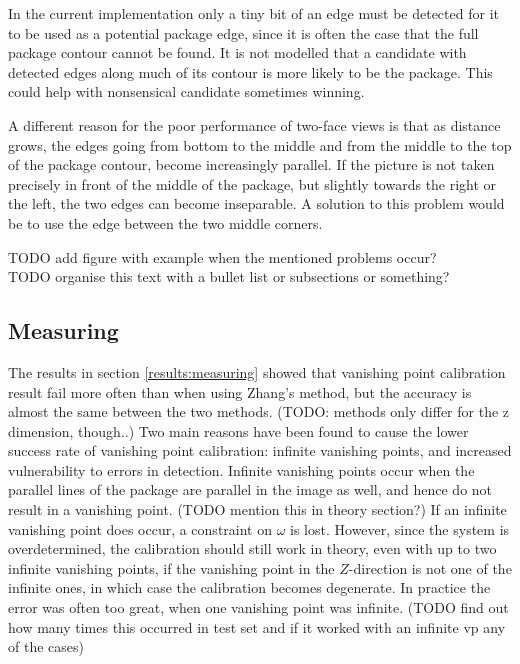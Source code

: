 In the current implementation only a tiny bit of an edge must be detected for it to be used as a potential package edge, since it is often the case that the full package contour cannot be found.
It is not modelled that a candidate with detected edges along much of its contour is more likely to be the package.
This could help with nonsensical candidate sometimes winning.

A different reason for the poor performance of two-face views is that as distance grows, the edges going from bottom to the middle and from the middle to the top of the package contour, become increasingly parallel. %
If the picture is not taken precisely in front of the middle of the package, but slightly towards the right or the left, the two edges can become inseparable.
A solution to this problem would be to use the edge between the two middle corners.


TODO add figure with example when the mentioned problems occur? %
\\TODO organise this text with a bullet list or subsections or something? %

\subsection{Measuring}
The results in section \ref{results:measuring} showed that vanishing point calibration result fail more often than when using Zhang's method, but the accuracy is almost the same between the two methods. (TODO: methods only differ for the z dimension, though..) %
Two main reasons have been found to cause the lower success rate of vanishing point calibration: infinite vanishing points, and increased vulnerability to errors in detection.
Infinite vanishing points occur when the parallel lines of the package are parallel in the image as well, and hence do not result in a vanishing point. (TODO mention this in theory section?) %
If an infinite vanishing point does occur, a constraint on $\omega$ is lost.%
However, since the system is overdetermined, the calibration should still work in theory, even with up to two infinite vanishing points, if the vanishing point in the $Z$-direction is not one of the infinite ones, in which case the calibration becomes degenerate.
In practice the error was often too great, when one vanishing point was infinite. (TODO find out how many times this occurred in test set and if it worked with an infinite vp any of the cases) %

